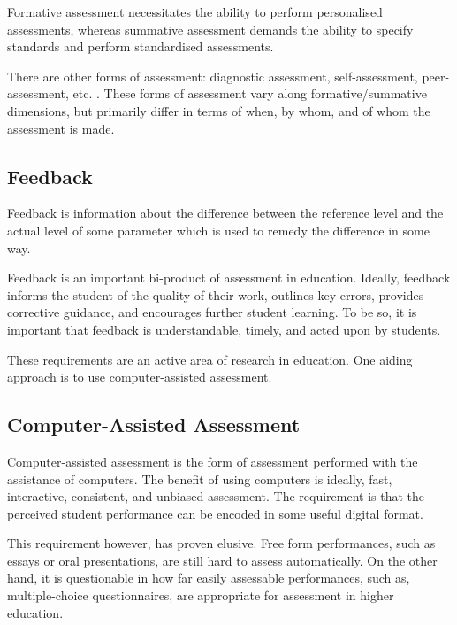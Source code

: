 Formative assessment necessitates the ability to perform personalised
assessments, whereas summative assessment demands the ability to specify
standards and perform standardised assessments.

There are other forms of assessment: diagnostic assessment, self-assessment,
peer-assessment, etc. \cite{bull-mckenna-2004,topping-1998}.  These forms of
assessment vary along formative/summative dimensions, but primarily differ in
terms of when, by whom, and of whom the assessment is made.

\subsection{Feedback}

\label{section:assessment-in-computer-science:feedback}

Feedback is information about the difference between the reference level and
the actual level of some parameter which is used to remedy the difference in
some way\cite{ramaprasad1989}.

Feedback is an important bi-product of assessment in
education\cite{black-william-1998}. Ideally, feedback informs the student of
the quality of their work, outlines key errors, provides corrective guidance,
and encourages further student learning. To be so, it is important that
feedback is understandable, timely, and acted upon by
students\cite{gibbs-simpson-2004}.

These requirements are an active area of research in education. One aiding
approach is to use computer-assisted assessment.

\subsection{Computer-Assisted Assessment}

Computer-assisted assessment is the form of assessment performed with the
assistance of computers\cite{conole-warburton-2005}. The benefit of using
computers is ideally, fast, interactive, consistent, and unbiased
assessment\cite{ala-mutka-2005}. The requirement is that the perceived student
performance can be encoded in some useful digital format.

This requirement however, has proven elusive. Free form performances, such as
essays or oral presentations, are still hard to assess
automatically\cite{valenti-et-al-2003}.  On the other hand, it is questionable
in how far easily assessable performances, such as, multiple-choice
questionnaires, are appropriate for assessment in higher
education\cite{conole-warburton-2005}.

